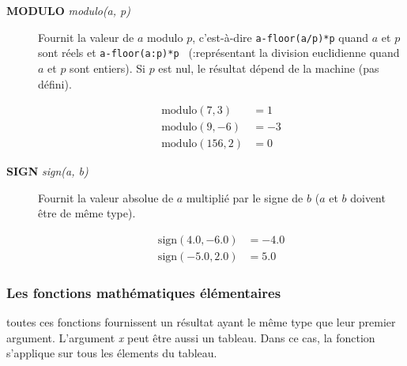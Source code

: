 \documentclass[a4paper,twoside]{article}
\begin{document}
\begin{description}
\item[\textbf{MODULO} \emph{modulo(a, p)}] Fournit la valeur de $a$ modulo $p$, c'est-à-dire \texttt{a-floor(a/p)*p} quand $a$ et $p$ sont réels et \texttt{a-floor(a:p)*p } (\og:\fg représentant la division euclidienne quand $a$ et $p$ sont entiers). Si $p$ est nul, le résultat dépend de la machine (pas défini). 
\begin{exemple}
\begin{align}
\mathrm{modulo}(7,3)  &= 1\\
\mathrm{modulo}(9,-6)  &= -3\\
\mathrm{modulo}(156,2)  &= 0
\end{align}
\end{exemple}

\item[\textbf{SIGN} \emph{sign(a, b)}] Fournit la valeur absolue de $a$ multiplié par le signe de $b$ ($a$ et $b$ doivent être de même type). 
\begin{exemple}
\begin{align}
\mathrm{sign}(4.0,-6.0)  &= -4.0\\
\mathrm{sign}(-5.0,2.0)  &= 5.0
\end{align}
\end{exemple}

\end{description}

\subsubsection{Les fonctions mathématiques élémentaires}

\begin{remarque}
toutes ces fonctions fournissent un résultat ayant le même type que leur premier argument. L'argument \emph{x} peut être aussi un tableau. Dans ce cas, la fonction s'applique sur tous les élements du tableau.
\end{remarque}
\end{document}
